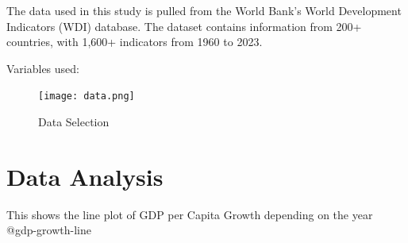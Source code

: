 \documentclass[
  letterpaper,
  DIV=11,
  numbers=noendperiod]{scrartcl}
\begin{document}
The data used in this study is pulled from the World Bank's World
Development Indicators (WDI) database. The dataset contains information
from 200+ countries, with 1,600+ indicators from 1960 to 2023.

Variables used:

\begin{figure}[H]

{\centering \texttt{[image: data.png]}

}

\caption{Data Selection}

\end{figure}%

\section{Data Analysis}\label{data-analysis}

This shows the line plot of GDP per Capita Growth depending on the year
@gdp-growth-line
\end{document}
